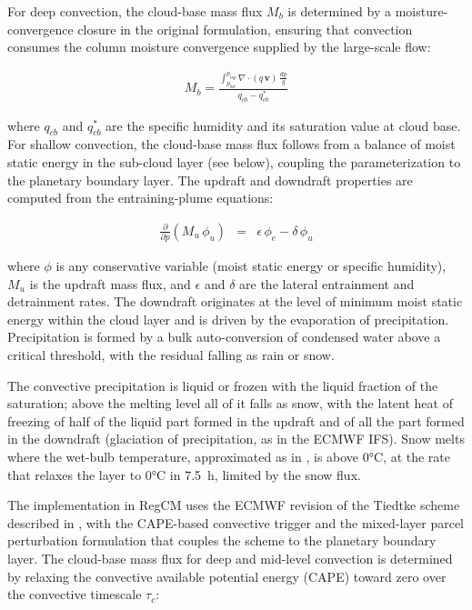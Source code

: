 {\begin{enumerate}
For deep convection, the cloud-base mass flux $M_b$ is determined by a
moisture-convergence closure in the original formulation, ensuring that
convection consumes the column moisture convergence supplied by the large-scale
flow:

\begin{eqnarray}
M_b = \frac{\displaystyle\int_{p_{bot}}^{p_{top}}
            \nabla\cdot(q\,\mathbf{v})\,\frac{dp}{g}}
           {\displaystyle q_{cb} - q^*_{cb}}
\label{eqn_model:TIEDclosure}
\end{eqnarray}

where $q_{cb}$ and $q^*_{cb}$ are the specific humidity and its saturation
value at cloud base. For shallow convection, the cloud-base mass flux follows
from a balance of moist static energy in the sub-cloud layer (see below),
coupling the parameterization to the planetary boundary layer. The updraft and downdraft
properties are computed from the entraining-plume equations:

\begin{eqnarray}
\frac{\partial}{\partial p}(M_u\,\phi_u) &=&
  \epsilon\,\phi_e - \delta\,\phi_u
\label{eqn_model:TIEDplume}
\end{eqnarray}

where $\phi$ is any conservative variable (moist static energy or specific
humidity), $M_u$ is the updraft mass flux, and $\epsilon$ and $\delta$ are the
lateral entrainment and detrainment rates. The downdraft originates at the
level of minimum moist static energy within the cloud layer and is driven by
the evaporation of precipitation. Precipitation is formed by a bulk
auto-conversion of condensed water above a critical threshold, with the
residual falling as rain or snow.

The convective precipitation is liquid or frozen with the liquid fraction of
the saturation; above the melting level all of it falls as snow, with the
latent heat of freezing of half of the liquid part formed in the updraft and
of all the part formed in the downdraft (glaciation of precipitation, as in the
ECMWF IFS).  Snow melts where the wet-bulb temperature, approximated as in
\citet{Wilson_99}, is above 0°C, at the rate that relaxes the layer to 0°C in
7.5~h, limited by the snow flux.

The implementation in RegCM uses the ECMWF revision of the Tiedtke scheme
described in \citet{Tiedtke_89}, with the CAPE-based convective trigger and
the mixed-layer parcel perturbation formulation that couples the scheme to the
planetary boundary layer. The cloud-base mass flux for deep and mid-level
convection is determined by relaxing the convective available potential energy
(CAPE) toward zero over the convective timescale $\tau_c$:


\end{enumerate}}
